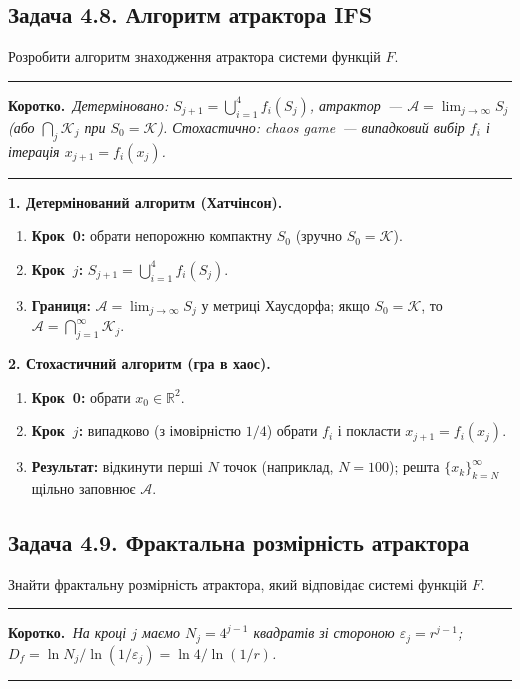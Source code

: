 \documentclass[12pt,a4paper]{article}
\newenvironment{korotko}
  {\par\medskip\noindent\begingroup\color{accent!75!black}\rule{\linewidth}{0.4pt}\par
   \noindent\textbf{Коротко.}\itshape\,}
  {\par\noindent\rule{\linewidth}{0.4pt}\endgroup\medskip}
\begin{document}
\subsection{Задача 4.8. Алгоритм атрактора IFS}
Розробити алгоритм знаходження атрактора системи функцій $F$.

\begin{korotko}
Детерміновано: $S_{j+1}=\bigcup_{i=1}^4 f_i(S_j)$, атрактор~---
$\mathcal{A}=\lim_{j\to\infty}S_j$ (або $\bigcap_j\mathcal{K}_j$ при $S_0=\mathcal{K}$).
Стохастично: chaos game~--- випадковий вибір $f_i$ і ітерація $x_{j+1}=f_i(x_j)$.
\end{korotko}

\textbf{1. Детермінований алгоритм (Хатчінсон).}
\begin{enumerate}[leftmargin=1.6em,itemsep=0.25em]
  \item \textbf{Крок~0:} обрати непорожню компактну $S_0$ (зручно $S_0=\mathcal{K}$).
  \item \textbf{Крок~$j$:} $S_{j+1}=\bigcup_{i=1}^4 f_i(S_j)$.
  \item \textbf{Границя:} $\mathcal{A}=\lim_{j\to\infty}S_j$ у метриці Хаусдорфа;
        якщо $S_0=\mathcal{K}$, то $\mathcal{A}=\bigcap_{j=1}^{\infty}\mathcal{K}_j$.
\end{enumerate}

\textbf{2. Стохастичний алгоритм (гра в хаос).}
\begin{enumerate}[leftmargin=1.6em,itemsep=0.25em]
  \item \textbf{Крок~0:} обрати $x_0\in\mathbb{R}^2$.
  \item \textbf{Крок~$j$:} випадково (з імовірністю $1/4$) обрати $f_i$ і покласти
        $x_{j+1}=f_i(x_j)$.
  \item \textbf{Результат:} відкинути перші $N$ точок (наприклад, $N=100$); решта
        $\{x_k\}_{k=N}^{\infty}$ щільно заповнює $\mathcal{A}$.
\end{enumerate}

\subsection{Задача 4.9. Фрактальна розмірність атрактора}
Знайти фрактальну розмірність атрактора, який відповідає системі функцій $F$.

\begin{korotko}
На кроці $j$ маємо $N_j=4^{j-1}$ квадратів зі стороною $\varepsilon_j=r^{j-1}$;
$D_f=\ln N_j/\ln(1/\varepsilon_j)=\ln4/\ln(1/r)$.
\end{korotko}
\end{document}
